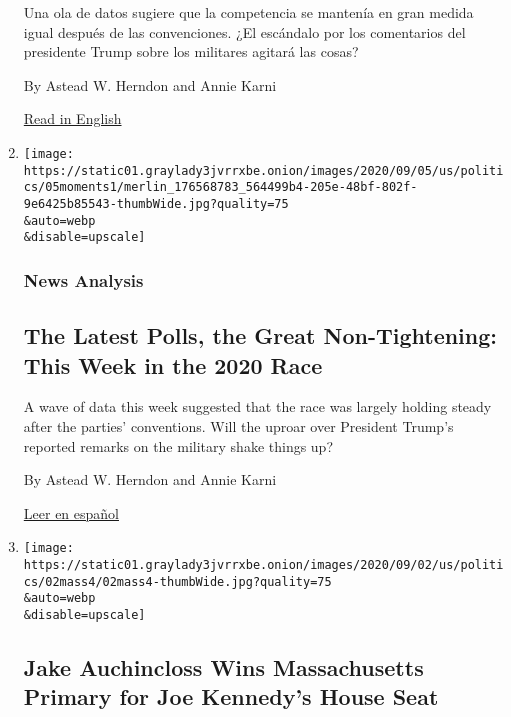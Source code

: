\begin{enumerate}
  Una ola de datos sugiere que la competencia se mantenía en gran medida
  igual después de las convenciones. ¿El escándalo por los comentarios
  del presidente Trump sobre los militares agitará las cosas?

  By Astead W. Herndon and Annie Karni

  \href{https://www.nytimes3xbfgragh.onion/2020/09/05/us/politics/trump-biden-polls-election.html}{Read
  in English}
\item
  \href{/2020/09/05/us/politics/trump-biden-polls-election.html}{}

  \texttt{[image: https://static01.graylady3jvrrxbe.onion/images/2020/09/05/us/politics/05moments1/merlin\_176568783\_564499b4-205e-48bf-802f-9e6425b85543-thumbWide.jpg?quality=75\\\&auto=webp\\\&disable=upscale]}

  \hypertarget{news-analysis}{%
  \subsubsection{News Analysis}\label{news-analysis}}

  \hypertarget{the-latest-polls-the-great-non-tightening-this-week-in-the-2020-race}{%
  \subsection{The Latest Polls, the Great Non-Tightening: This Week in
  the 2020
  Race}\label{the-latest-polls-the-great-non-tightening-this-week-in-the-2020-race}}

  A wave of data this week suggested that the race was largely holding
  steady after the parties' conventions. Will the uproar over President
  Trump's reported remarks on the military shake things up?

  By Astead W. Herndon and Annie Karni

  \href{https://www.nytimes3xbfgragh.onion/es/2020/09/07/espanol/estados-unidos/trump-biden-encuestas-elecciones.html}{Leer
  en español}
\item
  \href{/2020/09/04/us/politics/massachusetts-primary-auchincloss.html}{}

  \texttt{[image: https://static01.graylady3jvrrxbe.onion/images/2020/09/02/us/politics/02mass4/02mass4-thumbWide.jpg?quality=75\\\&auto=webp\\\&disable=upscale]}

  \hypertarget{jake-auchincloss-wins-massachusetts-primary-for-joe-kennedys-house-seat}{%
  \subsection{Jake Auchincloss Wins Massachusetts Primary for Joe
  Kennedy's House
  Seat}\label{jake-auchincloss-wins-massachusetts-primary-for-joe-kennedys-house-seat}}


\end{enumerate}
